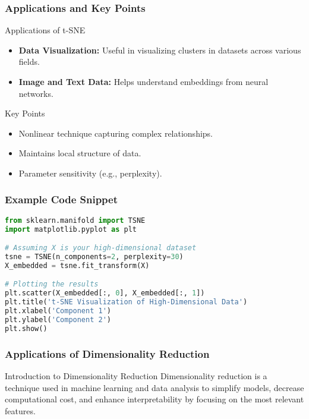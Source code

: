 \documentclass[aspectratio=169]{beamer}
\begin{document}
\begin{frame}[fragile]
    \frametitle{Applications and Key Points}
    \begin{block}{Applications of t-SNE}
        \begin{itemize}
            \item \textbf{Data Visualization:} Useful in visualizing clusters in datasets across various fields.
            \item \textbf{Image and Text Data:} Helps understand embeddings from neural networks.
        \end{itemize}
    \end{block}
    
    \begin{block}{Key Points}
        \begin{itemize}
            \item Nonlinear technique capturing complex relationships.
            \item Maintains local structure of data.
            \item Parameter sensitivity (e.g., perplexity).
        \end{itemize}
    \end{block}
\end{frame}

\begin{frame}[fragile]
    \frametitle{Example Code Snippet}
    \begin{lstlisting}[language=Python]
from sklearn.manifold import TSNE
import matplotlib.pyplot as plt

# Assuming X is your high-dimensional dataset
tsne = TSNE(n_components=2, perplexity=30)
X_embedded = tsne.fit_transform(X)

# Plotting the results
plt.scatter(X_embedded[:, 0], X_embedded[:, 1])
plt.title('t-SNE Visualization of High-Dimensional Data')
plt.xlabel('Component 1')
plt.ylabel('Component 2')
plt.show()
    \end{lstlisting}
\end{frame}

\begin{frame}[fragile]
    \frametitle{Applications of Dimensionality Reduction}
    \begin{block}{Introduction to Dimensionality Reduction}
        Dimensionality reduction is a technique used in machine learning and data analysis to simplify models, decrease computational cost, and enhance interpretability by focusing on the most relevant features.
    \end{block}
\end{frame}
\end{document}

